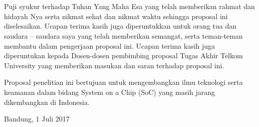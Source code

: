 \chapter*{\kataPengantar}

Puji syukur terhadap Tuhan Yang Maha Esa yang telah memberikan
rahmat dan hidayah Nya serta nikmat sehat dan nikmat waktu sehingga proposal
ini diselesaikan. Ucapan terima kasih juga diperuntukkan untuk orang tua dan
saudara – saudara saya yang telah memberikan semangat, serta teman-teman
membantu dalam pengerjaan proposal ini. Ucapan terima kasih juga diperuntukan
kepada Dosen-dosen pembimbing proposal Tugas Akhir Telkom
University yang memberikan masukan dan saran terhadap proposal ini.

\vspace*{0.5cm}
\noindent Proposal penelitian ini bertujuan untuk mengembangkan ilmu teknologi
serta keamanan dalam bidang System on a Chip (SoC) yang masih jarang
dikembangkan di Indonesia. 

\vspace*{0.1cm}
\begin{flushright}
Bandung, 1 Juli 2017\\[0.1cm]
\vspace*{1cm}
\penulis

\end{flushright}